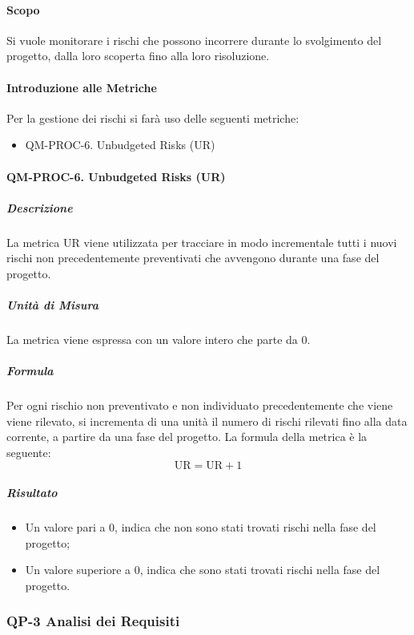 			\paragraph{Scopo}

			Si vuole monitorare i rischi che possono incorrere durante lo svolgimento del progetto, dalla loro scoperta fino alla loro risoluzione.

			\paragraph{Introduzione alle Metriche}

			Per la gestione dei rischi si farà uso delle seguenti metriche:

			\begin{itemize}
				\item QM-PROC-6. Unbudgeted Risks (UR)
			\end{itemize}

			\paragraph{QM-PROC-6. Unbudgeted Risks (UR)}

				\subparagraph{Descrizione}
				La metrica UR viene utilizzata per tracciare in modo incrementale tutti i nuovi rischi non precedentemente preventivati che avvengono durante una fase del progetto.

				\subparagraph{Unità di Misura}
				La metrica viene espressa con un valore intero che parte da 0.

				\subparagraph{Formula}
				Per ogni rischio non preventivato e non individuato precedentemente che viene viene rilevato, si incrementa di una unità il numero di rischi rilevati fino alla data corrente, a partire da una fase del progetto.
				La formula della metrica è la seguente:
				\[
					\text{UR} = \text{UR} + 1
				\]

				\subparagraph{Risultato}
				\begin{itemize}
					\item Un valore pari a 0, indica che non sono stati trovati rischi nella fase del progetto;
					\item Un valore superiore a 0, indica che sono stati trovati rischi nella fase del progetto.
				\end{itemize}

		\subsubsection{QP-3 Analisi dei Requisiti}

